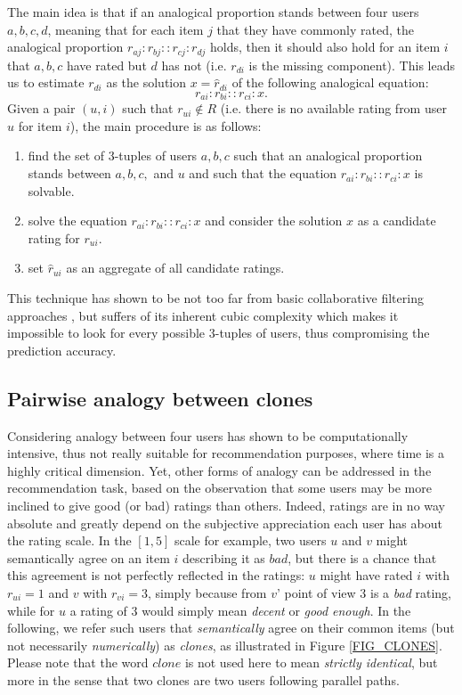 \documentclass[conference]{IEEEtran}
\newcommand{\predr}[1]{\hat{r}_{#1}}
\begin{document}
The main idea is that if an analogical proportion stands between four users $a,
b, c, d$, meaning that for each item $j$ that they have commonly rated, the
analogical proportion $r_{aj} : r_{bj} :: r_{cj} : r_{dj}$ holds, then it
should also hold for an item $i$ that $a, b, c$ have rated but $d$ has not
(i.e. $r_{di}$ is the missing component). This leads us to estimate $r_{di}$ as
the solution $x = \predr{di}$ of the following analogical equation:
$$r_{ai} : r_{bi} :: r_{ci} : x.$$
\noindent
Given a pair $(u,i)$ such that $r_{ui} \notin R$ (i.e. there is no available
rating from user $u$ for item $i$), the main procedure is as follows:
\begin{enumerate}
\item find the set of 3-tuples of users $a, b, c$ such that an analogical
  proportion stands between $a, b, c,$ and $u$ and such that the equation
  $r_{ai} : r_{bi} :: r_{ci} : x$ is solvable.
\item solve the equation $r_{ai} : r_{bi} :: r_{ci} : x$ and consider the
solution $x$ as a candidate rating for $r_{ui}$.  \item set $\predr{ui}$ as an
  aggregate of all candidate ratings.
\end{enumerate}

This technique has shown to be not too far from basic collaborative filtering
approaches \cite{HugPR15}, but suffers of its inherent cubic complexity which makes it
impossible to look for every possible 3-tuples of users, thus compromising the
prediction accuracy.

\subsection{Pairwise analogy between clones}
Considering analogy between four users has shown to be computationally
intensive, thus not really suitable for recommendation purposes, where time is
a highly critical dimension. Yet, other forms of analogy can be addressed in
the recommendation task, based on the observation that some users may be more
inclined to give good (or bad) ratings than others. Indeed, ratings are in no
way absolute and greatly depend on the subjective appreciation each user has
about the rating scale. In the $[1, 5]$ scale for example, two users $u$ and
$v$ might semantically agree on an item $i$ describing it as $bad$, but there
is a chance that this agreement is not perfectly reflected in the ratings: $u$
might have rated $i$ with $r_{ui} = 1$ and $v$ with $r_{vi} = 3$, simply
because from $v$' point of view $3$ is a \textit{bad} rating, while for $u$ a
rating of $3$ would simply mean \textit{decent} or \textit{good enough}.  In
the following, we refer such users that \textit{semantically} agree on their
common items (but not necessarily \textit{numerically}) as \textit{clones}, as
illustrated in Figure \ref{FIG_CLONES}. Please note that the word $clone$ is
not used here to mean \textit{strictly identical}, but more in the sense that
two clones are two users following parallel paths.
\end{document}
